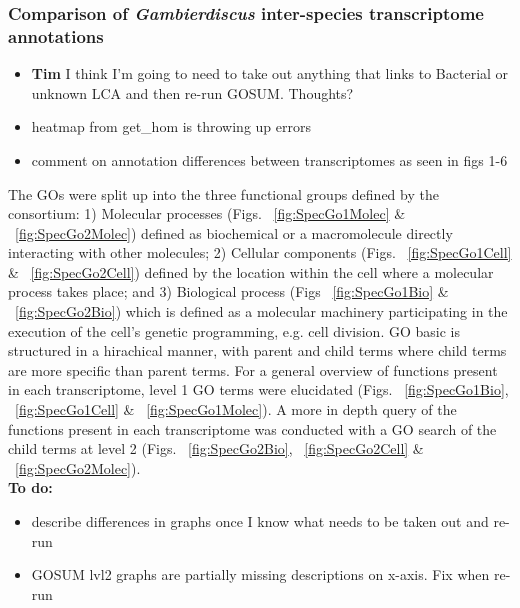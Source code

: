 \documentclass[12pt]{article}
\begin{document}
\subsubsection*{Comparison of \emph{Gambierdiscus} inter-species transcriptome annotations}
\FloatBarrier
\begin{itemize}
\item \textbf{Tim} I think I'm going to need to take out anything that links to Bacterial or unknown LCA and then re-run GOSUM. Thoughts?
\item heatmap from get\_hom is throwing up errors
\item comment on annotation differences between transcriptomes as seen in figs 1-6
\end{itemize}

The GOs were split up into the three functional groups defined by the consortium: 1) Molecular processes (Figs. ~\ref{fig:SpecGo1Molec} \& ~\ref{fig:SpecGo2Molec}) defined as biochemical or a macromolecule directly interacting with other molecules; 2) Cellular components (Figs. ~\ref{fig:SpecGo1Cell} \& ~\ref{fig:SpecGo2Cell}) defined by the location within the cell where a molecular process takes place; and 3) Biological process (Figs ~\ref{fig:SpecGo1Bio} \& ~\ref{fig:SpecGo2Bio}) which is defined as a molecular machinery participating in the execution of the cell's genetic programming, e.g. cell division.
GO basic is structured in a hirachical manner, with parent and child terms where child terms are more specific than parent terms. 
For a general overview of functions present in each transcriptome, level 1 GO terms were elucidated (Figs. ~\ref{fig:SpecGo1Bio}, ~\ref{fig:SpecGo1Cell} \& ~\ref{fig:SpecGo1Molec}). 
A more in depth query of the functions present in each transcriptome was conducted with a GO search of the child terms at level 2 (Figs. ~\ref{fig:SpecGo2Bio}, ~\ref{fig:SpecGo2Cell} \& ~\ref{fig:SpecGo2Molec}). \\
\textbf{To do:}
\begin{itemize}
\item describe differences in graphs once I know what needs to be taken out and re-run
\item GOSUM lvl2 graphs are partially missing descriptions on x-axis. Fix when re-run
\end{itemize}
\end{document}
